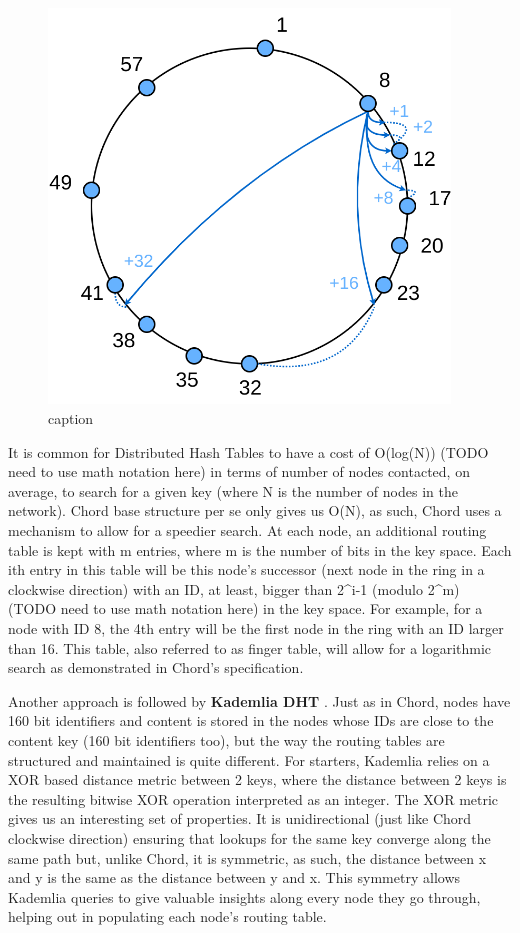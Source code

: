 \begin{figure}[hb!]
  \centering
  \includegraphics[width=0.95\textwidth]{img/chord.png}
  \caption{caption}
  \label{fig:chord}
\end{figure}

It is common for Distributed Hash Tables to have a cost of O(log(N))
(TODO need to use math notation here) in terms of number of nodes
contacted, on average, to search for a given key (where N is the number
of nodes in the network). Chord base structure per se only gives us
O(N), as such, Chord uses a mechanism to allow for a speedier search. At
each node, an additional routing table is kept with m entries, where m
is the number of bits in the key space. Each ith entry in this table
will be this node's successor (next node in the ring in a clockwise
direction) with an ID, at least, bigger than 2\^{}i-1 (modulo 2\^{}m)
(TODO need to use math notation here) in the key space. For example, for
a node with ID 8, the 4th entry will be the first node in the ring with
an ID larger than 16. This table, also referred to as finger table, will
allow for a logarithmic search as demonstrated in Chord's specification.

Another approach is followed by \textbf{Kademlia DHT} \cite{Maymounkov2002}.
Just as in Chord, nodes have 160 bit identifiers and content is
stored in the nodes whose IDs are close to the content key (160 bit
identifiers too), but the way the routing tables are structured and
maintained is quite different. For starters, Kademlia relies on a XOR
based distance metric between 2 keys, where the distance between 2 keys
is the resulting bitwise XOR operation interpreted as an integer. The
XOR metric gives us an interesting set of properties. It is
unidirectional (just like Chord clockwise direction) ensuring that
lookups for the same key converge along the same path but, unlike Chord,
it is symmetric, as such, the distance between x and y is the same as
the distance between y and x. This symmetry allows Kademlia queries to
give valuable insights along every node they go through, helping out in
populating each node's routing table.

